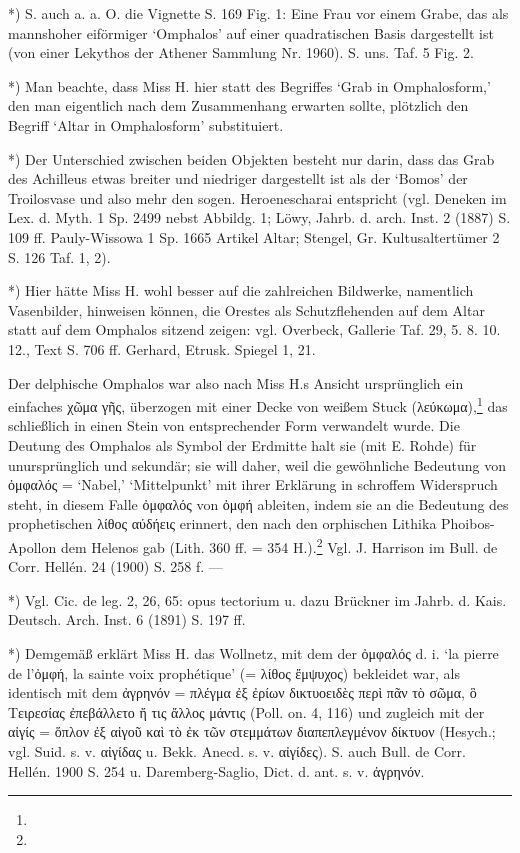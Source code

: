 \documentclass[a4paper, 11pt, oneside]{article}
\begin{document}
*) S. auch a. a. O. die Vignette S. 169 Fig. 1: Eine Frau vor einem Grabe, das als mannshoher eiförmiger `Omphalos' auf einer quadratischen Basis dargestellt ist (von einer Lekythos der Athener Sammlung Nr. 1960). S. uns. Taf. 5 Fig. 2.

*) Man beachte, dass Miss H. hier statt des Begriffes `Grab in Omphalosform,' den man eigentlich nach dem Zusammenhang erwarten sollte, plötzlich den Begriff `Altar in Omphalosform' substituiert.

*) Der Unterschied zwischen beiden Objekten besteht nur darin, dass das Grab des Achilleus etwas breiter und niedriger dargestellt ist als der `Bomos' der Troilosvase und also mehr den sogen. Heroenescharai entspricht (vgl. Deneken im Lex. d. Myth. 1 Sp. 2499 nebst Abbildg. 1; Löwy, Jahrb. d. arch. Inst. 2 (1887) S. 109 ff. Pauly-Wissowa 1 Sp. 1665 Artikel Altar; Stengel, Gr. Kultusaltertümer 2 S. 126 Taf. 1, 2).

*) Hier hätte Miss H. wohl besser auf die zahlreichen Bildwerke, namentlich Vasenbilder, hinweisen können, die Orestes als Schutzflehenden auf dem Altar statt auf dem Omphalos sitzend zeigen: vgl. Overbeck, Gallerie Taf. 29, 5. 8. 10. 12., Text S. 706 ff. Gerhard, Etrusk. Spiegel 1, 21.

Der delphische Omphalos war also nach Miss H.s Ansicht ursprünglich ein einfaches χῶμα γῆς, überzogen mit einer Decke von weißem Stuck (λεύκωμα),\footnote{} das schließlich in einen Stein von entsprechender Form verwandelt wurde. Die Deutung des Omphalos als Symbol der Erdmitte halt sie (mit E. Rohde) für unursprünglich und sekundär; sie will daher, weil die gewöhnliche Bedeutung von ὀμφαλός = `Nabel,' `Mittelpunkt' mit ihrer Erklärung in schroffem Widerspruch steht, in diesem Falle ὀμφαλός von ὀμφή ableiten, indem sie an die Bedeutung des prophetischen λίθος αύδήεις erinnert, den nach den orphischen Lithika Phoibos-Apollon dem Helenos gab (Lith. 360 ff. = 354 H.).\footnote{} Vgl. J. Harrison im Bull. de Corr. Hellén. 24 (1900) S. 258 f. ---

*) Vgl. Cic. de leg. 2, 26, 65: opus tectorium u. dazu Brückner im Jahrb. d. Kais. Deutsch. Arch. Inst. 6 (1891) S. 197 ff.

*) Demgemäß erklärt Miss H. das Wollnetz, mit dem der ὀμφαλός d. i. `la pierre de l'ὀμφή, la sainte voix prophétique' (= λίθος ἔμψυχος) bekleidet war, als identisch mit dem ἀγρηνόν = πλέγμα ἐξ ἐρίων δικτυοειδὲς περὶ πᾶν τὸ σῶμα, ὃ Τειρεσίας ἐπεβάλλετο ἤ τις ἄλλος μάντις (Poll. on. 4, 116) und zugleich mit der αἰγίς = ὅπλον ἐξ αἰγοῦ καὶ τὸ ἐκ τῶν στεμμάτων διαπεπλεγμένον δίκτυον (Hesych.; vgl. Suid. s. v. αἰγίδας u. Bekk. Anecd. s. v. αἰγίδες). S. auch Bull. de Corr. Hellén. 1900 S. 254 u. Daremberg-Saglio, Dict. d. ant. s. v. ἀγρηνόν.
\end{document}

